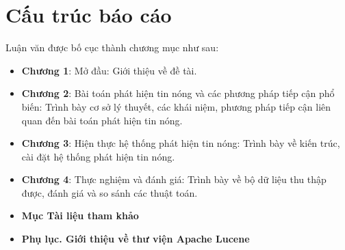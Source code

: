 \section{Cấu trúc báo cáo}
Luận văn được bố cục thành chương mục như sau:
\begin{itemize}
	\item \textbf{Chương 1}: Mở đầu: Giới thiệu về đề tài.
	\item \textbf{Chương 2}: Bài toán phát hiện tin nóng và các phương pháp tiếp cận phổ biến: Trình bày cơ sở lý thuyết, các khái niệm, phương pháp tiếp cận liên quan đến bài toán phát hiện tin nóng.
	\item \textbf{Chương 3}: Hiện thực hệ thống phát hiện tin nóng: Trình bày về kiến trúc, cài đặt hệ thống phát hiện tin nóng.
	\item \textbf{Chương 4}: Thực nghiệm và đánh giá: Trình bày về bộ dữ liệu thu thập được, đánh giá và so sánh các thuật toán.
	\item \textbf{Mục Tài liệu tham khảo}
	\item \textbf{Phụ lục. Giới thiệu về thư viện Apache Lucene}
\end{itemize}
